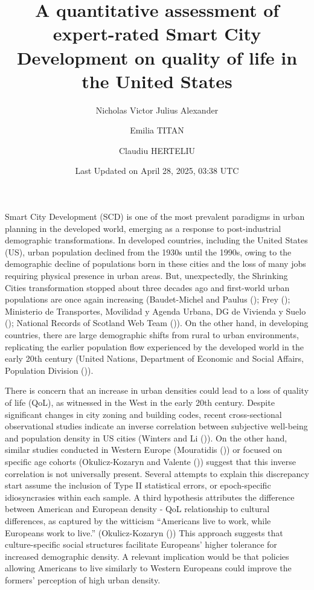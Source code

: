 \documentclass[
  english,
  12pt,
  a4paper,
]{scrartcl}
\title{A quantitative assessment of expert-rated Smart City Development
on quality of life in the United States}
\author[1]{Nicholas Victor Julius Alexander}
\author[1]{Emilia TITAN}
\author[1]{Claudiu HERTELIU}
\affil[1]{Department of Statistics and Econometrics, Bucharest
University for Economic Studies}
\date{Last Updated on April 28, 2025, 03:38 UTC}
\begin{document}
\maketitle


Smart City Development (SCD) is one of the most prevalent paradigms in
urban planning in the developed world, emerging as a response to
post-industrial demographic transformations. In developed countries,
including the United States (US), urban population declined from the
1930s until the 1990s, owing to the demographic decline of populations
born in these cities and the loss of many jobs requiring physical
presence in urban areas. But, unexpectedly, the Shrinking Cities
transformation stopped about three decades ago and first-world urban
populations are once again increasing (Baudet-Michel and Paulus
();
Frey (); Ministerio de
Transportes, Movilidad y Agenda Urbana, DG de Vivienda y Suelo
();
National Records of Scotland Web Team
()).
On the other hand, in developing countries, there are large demographic
shifts from rural to urban environments, replicating the earlier
population flow experienced by the developed world in the early 20th
century (United Nations, Department of Economic and Social Affairs,
Population Division
()).

There is concern that an increase in urban densities could lead to a
loss of quality of life (QoL), as witnessed in the West in the early
20th century. Despite significant changes in city zoning and building
codes, recent cross-sectional observational studies indicate an inverse
correlation between subjective well-being and population density in US
cities (Winters and Li
()). On the
other hand, similar studies conducted in Western Europe (Mouratidis
()) or focused on
specific age cohorts (Okulicz-Kozaryn and Valente
()) suggest that
this inverse correlation is not universally present. Several attempts to
explain this discrepancy start assume the inclusion of Type II
statistical errors, or epoch-specific idiosyncrasies within each sample.
A third hypothesis attributes the difference between American and
European density - QoL relationship to cultural differences, as captured
by the witticism ``Americans live to work, while Europeans work to
live.'' (Okulicz-Kozaryn
()) This
approach suggests that culture-specific social structures facilitate
Europeans' higher tolerance for increased demographic density. A
relevant implication would be that policies allowing Americans to live
similarly to Western Europeans could improve the formers' perception of
high urban density.
\end{document}
